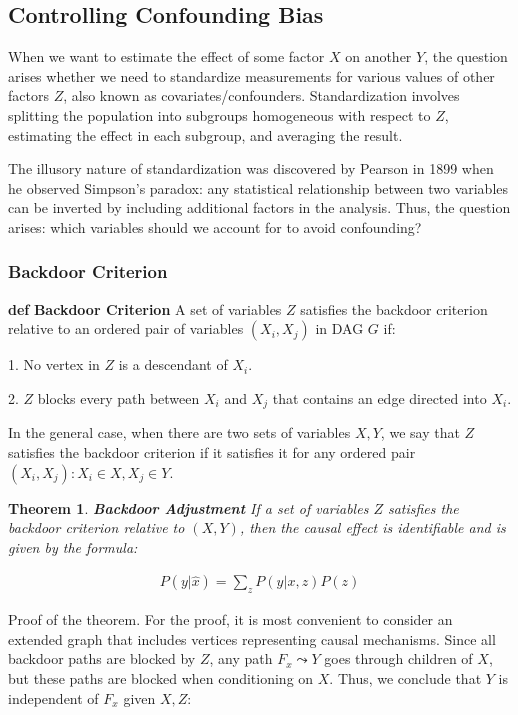 \documentclass[fleqn]{article}
\def\define#1{\textbf{def} \textbf{#1}}
\newtheorem{theorem}{Theorem}
\numberwithin{equation}{section}
\numberwithin{theorem}{section}
\numberwithin{figure}{section}
\numberwithin{lemma}{section}
\numberwithin{corollary}{section}
\begin{document}
\subsection*{Controlling Confounding Bias}

When we want to estimate the effect of some factor $X$ on another $Y$, the question arises whether we need to standardize measurements for various values of other factors $Z$, also known as covariates/confounders. Standardization involves splitting the population into subgroups homogeneous with respect to $Z$, estimating the effect in each subgroup, and averaging the result.

The illusory nature of standardization was discovered by Pearson in 1899 when he observed Simpson's paradox: any statistical relationship between two variables can be inverted by including additional factors in the analysis. Thus, the question arises: which variables should we account for to avoid confounding?

\subsubsection*{Backdoor Criterion}

\define{Backdoor Criterion} A set of variables $Z$ satisfies the backdoor criterion relative to an ordered pair of variables $(X_i, X_j)$ in DAG $G$ if:

1. No vertex in $Z$ is a descendant of $X_i$.

2. $Z$ blocks every path between $X_i$ and $X_j$ that contains an edge directed into $X_i$.

In the general case, when there are two sets of variables $X, Y$, we say that $Z$ satisfies the backdoor criterion if it satisfies it for any ordered pair $(X_i, X_j): X_i \in X, X_j \in Y$.

\begin{theorem}
	\textbf{Backdoor Adjustment} If a set of variables $Z$ satisfies the backdoor criterion relative to $(X,Y)$, then the causal effect is identifiable and is given by the formula:
	
	\begin{align}
		P(y|\hat x) = \sum\limits_{z} P(y|x, z) P(z)
	\end{align}
\end{theorem}

Proof of the theorem. For the proof, it is most convenient to consider an extended graph that includes vertices representing causal mechanisms. Since all backdoor paths are blocked by $Z$, any path $F_x \leadsto Y$ goes through children of $X$, but these paths are blocked when conditioning on $X$. Thus, we conclude that $Y$ is independent of $F_x$ given $X, Z$:
\end{document}
